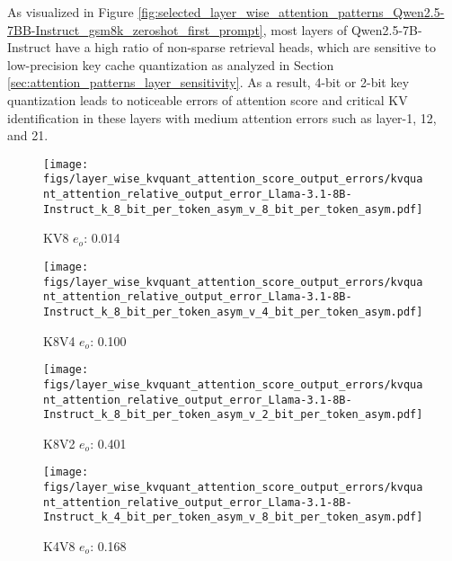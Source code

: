 As visualized in Figure \ref{fig:selected_layer_wise_attention_patterns_Qwen2.5-7BB-Instruct_gsm8k_zeroshot_first_prompt}, most layers of Qwen2.5-7B-Instruct have a high ratio of non-sparse retrieval heads, which are sensitive to low-precision key cache quantization as analyzed in Section \ref{sec:attention_patterns_layer_sensitivity}. As a result, 4-bit or 2-bit key quantization leads to noticeable errors of attention score and critical KV identification in these layers with medium attention errors such as layer-1, 12, and 21. 


%
%
\begin{figure*}
    \centering
    \begin{subfigure}{0.25\textwidth}
    \texttt{[image: figs/layer\_wise\_kvquant\_attention\_score\_output\_errors/kvquant\_attention\_relative\_output\_error\_Llama-3.1-8B-Instruct\_k\_8\_bit\_per\_token\_asym\_v\_8\_bit\_per\_token\_asym.pdf]}
    \caption{KV8 $e_o$: 0.014}
    \label{fig:full_kvcache_simulated_quant_error_layer_wise_k8v8_per_token_asym_Llama-3.1-8B-Instruct}
    \end{subfigure}
    \begin{subfigure}{0.25\textwidth}
    \texttt{[image: figs/layer\_wise\_kvquant\_attention\_score\_output\_errors/kvquant\_attention\_relative\_output\_error\_Llama-3.1-8B-Instruct\_k\_8\_bit\_per\_token\_asym\_v\_4\_bit\_per\_token\_asym.pdf]}
    \caption{K8V4 $e_o$: 0.100}
    \label{fig:full_kvcache_simulated_quant_error_layer_wise_k8v4_per_token_asym_Llama-3.1-8B-Instruct}
    \end{subfigure}
    \begin{subfigure}{0.25\textwidth}
    \texttt{[image: figs/layer\_wise\_kvquant\_attention\_score\_output\_errors/kvquant\_attention\_relative\_output\_error\_Llama-3.1-8B-Instruct\_k\_8\_bit\_per\_token\_asym\_v\_2\_bit\_per\_token\_asym.pdf]}
    \caption{K8V2 $e_o$: 0.401}
    \label{fig:full_kvcache_simulated_quant_error_layer_wise_k8v2_per_token_asym_Llama-3.1-8B-Instruct}
    \end{subfigure}
    \begin{subfigure}{0.25\textwidth}
    \texttt{[image: figs/layer\_wise\_kvquant\_attention\_score\_output\_errors/kvquant\_attention\_relative\_output\_error\_Llama-3.1-8B-Instruct\_k\_4\_bit\_per\_token\_asym\_v\_8\_bit\_per\_token\_asym.pdf]}
    \caption{K4V8 $e_o$: 0.168}
    \label{fig:full_kvcache_simulated_quant_error_layer_wise_k4v8_per_token_asym_Llama-3.1-8B-Instruct}
    \end{subfigure}

\end{figure*}
